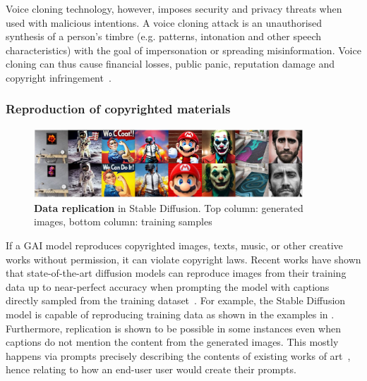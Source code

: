\documentclass[conference,table]{IEEEtran} %
\begin{document}
Voice cloning technology, however, imposes security and privacy threats when used with malicious intentions.
A voice cloning attack is an unauthorised synthesis of a person's timbre (e.g. patterns, intonation and other speech characteristics) with the goal of impersonation or spreading misinformation. 
Voice cloning can thus cause financial losses, public panic, reputation damage and copyright infringement~\cite{brewster_fraudsters_2021}.

\subsubsection{Reproduction of copyrighted materials} 
    \begin{figure}[ht]
    \centering
    \includegraphics[width=0.9\textwidth]{figures/replicate_userprompts.JPG}
    \caption{\textbf{Data replication} in Stable Diffusion. Top column: generated images, bottom column: training samples~\cite{somepalli_understanding_2023}}
    \label{fig:replication-user}
\end{figure}
If a GAI model reproduces copyrighted images, texts, music, or other creative works without permission, it can violate copyright laws. 
Recent works have shown that state-of-the-art diffusion models can reproduce images from their training data up to near-perfect accuracy when prompting the model with captions directly sampled from the training dataset~\cite{somepalli_diffusion_2022,carlini_extracting_2023}. 
For example, the Stable Diffusion model is capable of reproducing training data as shown in the examples in .
Furthermore, replication is shown to be possible in some instances even when captions do not mention the content from the generated images. 
This mostly happens via prompts precisely describing the contents of existing works of art~\cite{somepalli_understanding_2023}, hence relating to how an end-user user would create their prompts. %
\end{document}
